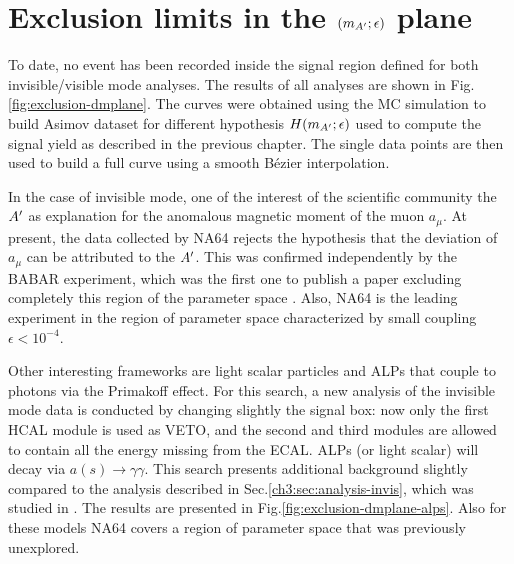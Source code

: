 \section{Exclusion limits in the $(m_{A'};\epsilon)$ plane}
\label{ch4:sec:exclusion-limits}

To date, no event has been recorded inside the signal region defined for both invisible/visible mode analyses. The results of all analyses are shown in Fig.\ref{fig:exclusion-dmplane}. The curves were obtained using the MC simulation to build Asimov dataset for different hypothesis $H(m_{A'};\epsilon)$ used to compute the signal yield as described in the previous chapter. The single data points are then used to build a full curve using a smooth Bézier interpolation.

In the case of invisible mode, one of the interest of the scientific community the $A'$ as explanation for the anomalous magnetic moment of the muon $a_{\mu}$. At present, the data collected by NA64 rejects the hypothesis that the deviation of $a_{\mu}$ can be attributed to the $A'$. This was confirmed independently by the BABAR experiment, which was the first one to publish a paper excluding completely this region of the parameter space \cite{PhysRevLett.119.131804}. Also, NA64 is the leading experiment in the region of parameter space characterized by small coupling $\epsilon < 10^{-4}$.

Other interesting frameworks are light scalar particles and ALPs that couple to photons via the Primakoff effect. For this search, a new analysis of the invisible mode data is conducted by changing slightly the signal box: now only the first HCAL module is used as VETO, and the second and third modules are allowed to contain all the energy missing from the ECAL. ALPs (or light scalar) will decay via $a(s) \to \gamma \gamma$. This search presents additional background slightly compared to the analysis described in Sec.\ref{ch3:sec:analysis-invis}, which was studied in \cite{Banerjee:2020fue}. The results are presented in Fig.\ref{fig:exclusion-dmplane-alps}. Also for these models NA64 covers a region of parameter space that was previously unexplored.

